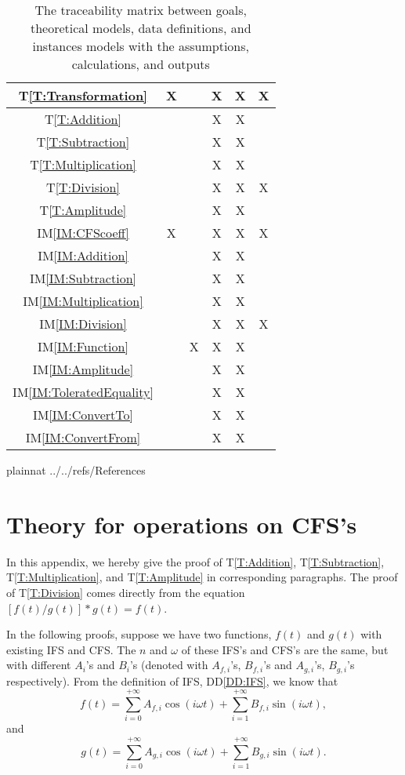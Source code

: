 \documentclass[12pt]{article}
\newcommand{\ddref}[1]{DD\ref{#1}}
\newcommand{\tref}[1]{T\ref{#1}}
\newcommand{\iref}[1]{IM\ref{#1}}
\begin{document}
\begin{table}
\begin{tabular}{|c|c|c|c|c|c|}
		\tref{T:Transformation}
		&X& &X&X&X\\\hline
		\tref{T:Addition}
		& & &X&X& \\\hline
		\tref{T:Subtraction}
		& & &X&X& \\\hline
		\tref{T:Multiplication}
		& & &X&X& \\\hline
		\tref{T:Division}
		& & &X&X&X\\\hline
		\tref{T:Amplitude}
		& & &X&X& \\\hline
		\iref{IM:CFScoeff}
		&X& &X&X&X\\\hline
		\iref{IM:Addition}
		& & &X&X& \\\hline
		\iref{IM:Subtraction}
		& & &X&X& \\\hline
		\iref{IM:Multiplication}
		& & &X&X& \\\hline
		\iref{IM:Division}
		& & &X&X&X\\\hline
		\iref{IM:Function}
		& &X&X&X& \\\hline
		\iref{IM:Amplitude}
		& & &X&X& \\\hline
		\iref{IM:ToleratedEquality}
		& & &X&X& \\\hline
		\iref{IM:ConvertTo}
		& & &X&X& \\\hline
		\iref{IM:ConvertFrom}
		& & &X&X& \\\hline		
	\end{tabular}
	\caption{The traceability matrix between goals, 
		theoretical models, data definitions, and instances models 
		with the assumptions, calculations, and outputs}
	\label{Table:Traceability}
\end{table} 

\newpage

 {plainnat}
 {../../refs/References}

\newpage
\appendix

\section{Theory for operations on CFS's}\label{Appendix:Operations}
In this appendix, we hereby give the proof of 
\tref{T:Addition}, \tref{T:Subtraction}, \tref{T:Multiplication}, 
and \tref{T:Amplitude} in corresponding paragraphs. The proof of 
\tref{T:Division} comes directly from the equation 
$[f(t)/g(t)]*g(t)=f(t)$.

In the following proofs, suppose we have two functions, 
$f(t)$ and $g(t)$ with existing IFS and CFS. The $n$ and $\omega$ of 
these IFS's and CFS's are the same, but with different $A_i$'s and $B_i$'s 
(denoted with $A_{f, i}$'s, $B_{f, i}$'s and $A_{g,i}$'s, 
$B_{g,i}$'s respectively).
From the definition of IFS, \ddref{DD:IFS}, we know that 
\begin{equation}\label{Eq:fDef}
f(t)=\sum_{i=0}^{+\infty}A_{f, i}\cos(i\omega t)
+\sum_{i=1}^{+\infty}B_{f, i}\sin(i\omega t),
\end{equation} and \begin{equation}\label{Eq:gDef}
g(t)=\sum_{i=0}^{+\infty}A_{g, i}\cos(i\omega t)
+\sum_{i=1}^{+\infty}B_{g, i}\sin(i\omega t).
\end{equation}  
\end{document}
